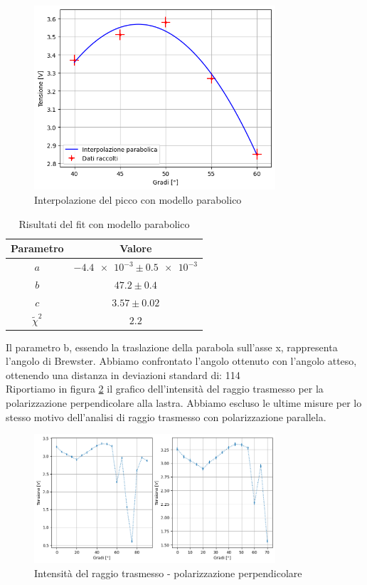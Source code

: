\documentclass[letterpaper,12pt]{article}
\begin{document}
\begin{figure}[h!]
	\centering
	\includegraphics[width = 0.8\textwidth]{brew_angle.png}
	\caption{Interpolazione del picco con modello parabolico}
	\label{fig:parabola}
\end{figure}

\begin{table}[h!]
	\centering
	\begin{tabular}{|c|c|}
		\hline
		\textbf{Parametro} & \textbf{Valore} \\
		\hline
		$a$ & $\num{-4.4e-3} \pm \num{0.5e-3}$ \\
		$b$ & $47.2 \pm 0.4$ \\
		$c$ & $3.57 \pm 0.02$ \\
		$\tilde\chi^2$ & $2.2$ \\
		\hline
	\end{tabular}
	\caption{Risultati del fit con modello parabolico}
	\label{tab:fit_brew_trasmesso}
\end{table}

Il parametro b, essendo la traslazione della parabola sull'asse x, rappresenta l'angolo di Brewster. Abbiamo
confrontato l'angolo ottenuto con l'angolo atteso, ottenendo una distanza in deviazioni standard di: 114\\

Riportiamo in figura \ref{fig:wrong_pol} il grafico dell'intensità del raggio trasmesso per la polarizzazione
perpendicolare alla lastra. Abbiamo escluso le ultime misure per lo stesso motivo dell'analisi di raggio trasmesso
con polarizzazione parallela.

\begin{figure}[h]
	\centering
	\includegraphics[width = 0.8\textwidth]{wrong_pol.png}
	\caption{Intensità del raggio trasmesso - polarizzazione perpendicolare}
	\label{fig:wrong_pol}
\end{figure}
\end{document}
